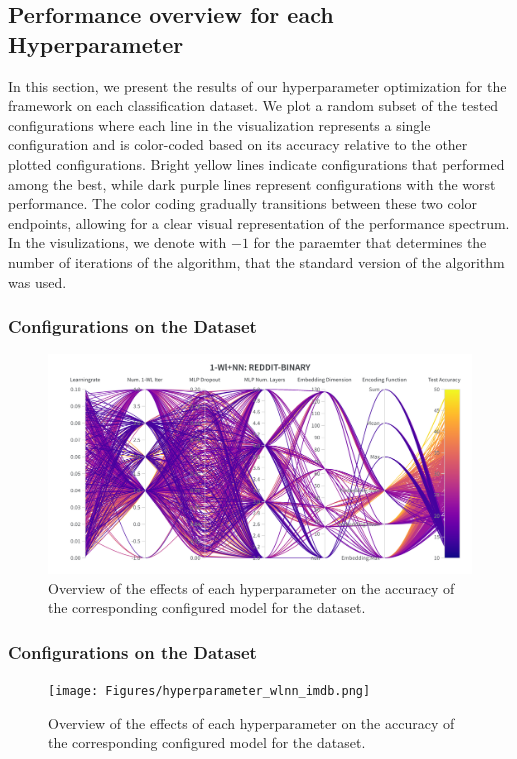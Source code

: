 \subsection{Performance overview for each Hyperparameter}
In this section, we present the results of our hyperparameter optimization for the \wlnn framework on each classification dataset. We plot a random subset of the tested configurations where each line in the visualization represents a single configuration and is color-coded based on its accuracy relative to the other plotted configurations. Bright yellow lines indicate configurations that performed among the best, while dark purple lines represent configurations with the worst performance. The color coding gradually transitions between these two color endpoints, allowing for a clear visual representation of the performance spectrum. In the visulizations, we denote with $-1$ for the paraemter that determines the number of iterations of the \wl algorithm, that the  standard version of the algorithm was used. 

\subsubsection{\wlnn Configurations on the \enzymes Dataset}
\begin{figure}[H]
    \centering
    \includegraphics[width=\textwidth, trim={0 75 0 150}, clip]{Figures/hyperparameter_wlnn_enzymes.png}
    \caption{Overview of the effects of each hyperparameter on the accuracy of the corresponding configured \wlnn model for the \enzymes dataset.}
    \label{fig:wandb_wlnn_enzymes}
\end{figure}

\subsubsection{\wlnn Configurations on the \imdb Dataset}
\begin{figure}[H]
    \centering
    \texttt{[image: Figures/hyperparameter\_wlnn\_imdb.png]}
    \caption{Overview of the effects of each hyperparameter on the accuracy of the corresponding configured \wlnn model for the \imdb dataset.}
    \label{fig:wandb_wlnn_imdb}
\end{figure}
\clearpage

